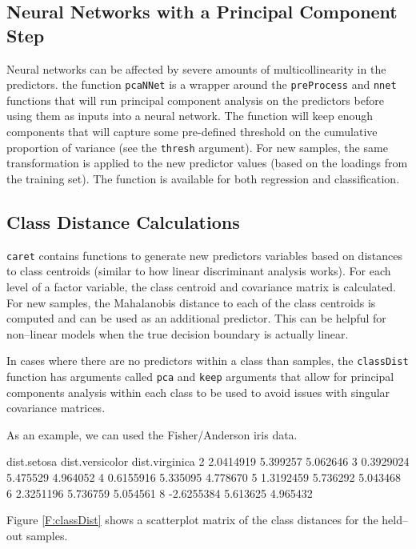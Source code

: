 \documentclass[12pt]{article}
\begin{document}
\subsection{Neural Networks with a Principal Component Step}

Neural networks can be affected by severe amounts of multicollinearity in the predictors. the function \texttt{pcaNNet} is a wrapper around the \texttt{preProcess} and \texttt{nnet} functions that will run principal component analysis on the predictors before using them as inputs into a neural network. The function will keep enough components that will capture some pre-defined threshold on the cumulative proportion of variance (see the \texttt{thresh} argument). For new samples, the same transformation is applied to the new predictor values (based on the loadings from the training set). The function is available for both regression and classification. 

\subsection{Class Distance Calculations}

\texttt{caret} contains functions to generate new predictors variables based on distances to class centroids (similar to how linear discriminant analysis works). For each level of a factor variable, the class centroid and covariance matrix is calculated. For new samples, the Mahalanobis distance to each of the class centroids is computed and can be used as an additional predictor. This can be helpful for non--linear models when the true decision boundary is actually linear.

In cases where there are no predictors within a class than samples, the \texttt{classDist} function has arguments called \texttt{pca} and \texttt{keep} arguments that allow for principal components analysis within each class to be used to avoid issues with singular covariance matrices. 

As an example, we can used the Fisher/Anderson iris data. 
\begin{Schunk}
\begin{Soutput}
  dist.setosa dist.versicolor dist.virginica
2   2.0414919        5.399257       5.062646
3   0.3929024        5.475529       4.964052
4   0.6155916        5.335095       4.778670
5   1.3192459        5.736292       5.043468
6   2.3251196        5.736759       5.054561
8  -2.6255384        5.613625       4.965432
\end{Soutput}
\end{Schunk}
Figure \ref{F:classDist} shows a scatterplot matrix of the class distances for the held--out samples. 
\end{document}
